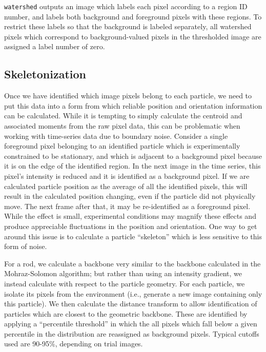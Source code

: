 \texttt{watershed} outputs an image which labels each pixel according to a region ID number, and labels both background
and foreground pixels with these regions. To restrict these labels so that the background is labeled separately, all 
watershed pixels which correspond to background-valued pixels in the thresholded image are assigned a label number of zero.

\subsection{Skeletonization}

Once we have identified which image pixels belong to each particle, we need to put this data into a form from
which reliable position and orientation information can be calculated.  While it is tempting to simply
calculate the centroid and associated moments from the raw pixel data, this can be problematic when working with
time-series data due to boundary noise. Consider a single foreground pixel belonging to 
an identified particle which is experimentally
constrained to be stationary, and which is adjacent to a background pixel because it is on the edge of the identified 
region. In the next image in the time series, this pixel's intensity is reduced and it is identified as a background
pixel.  If we are calculated particle position as the average of all the identified pixels, this will result in 
the calculated position changing, even if the particle did not physically move. The next frame after that, it 
may be re-identified as a foreground pixel.  While the effect is small, experimental conditions may magnify
these effects and produce appreciable fluctuations in the position and orientation. One way to get around this issue
is to calculate a particle ``skeleton'' which is less sensitive to this form of noise.

For a rod, we calculate a backbone very similar to the backbone calculated in the Mohraz-Solomon algorithm; but rather 
than using an intensity gradient, we instead calculate with respect to the particle geometry. For each particle, we 
isolate its pixels from the environment (i.e., generate a new image containing only this particle). We then
calculate the distance transform to allow identification of particles which are closest to the 
geometric backbone.  These are identified by applying a ``percentile threshold'' in which the all pixels which
fall below a given percentile in the distribution are reassigned as background pixels. Typical cutoffs used
are 90-95\%, depending on trial images.

